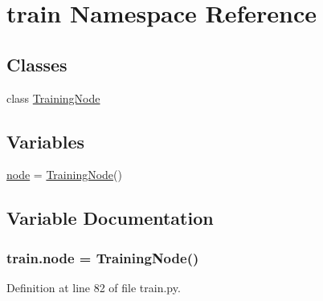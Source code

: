 \hypertarget{namespacetrain}{}\section{train Namespace Reference}
\label{namespacetrain}
\subsection*{Classes}
\begin{DoxyCompactItemize}
\item 
class \hyperlink{classtrain_1_1_training_node}{Training\+Node}
\end{DoxyCompactItemize}
\subsection*{Variables}
\begin{DoxyCompactItemize}
\item 
\hyperlink{namespacetrain_a7c68a6981d3c74c76920e856fc7c2419}{node} = \hyperlink{classtrain_1_1_training_node}{Training\+Node}()
\end{DoxyCompactItemize}


\subsection{Variable Documentation}
\subsubsection[{\texorpdfstring{node}{node}}]{\setlength{\rightskip}{0pt plus 5cm}train.\+node = {\bf Training\+Node}()}\hypertarget{namespacetrain_a7c68a6981d3c74c76920e856fc7c2419}{}\label{namespacetrain_a7c68a6981d3c74c76920e856fc7c2419}


Definition at line 82 of file train.\+py.

